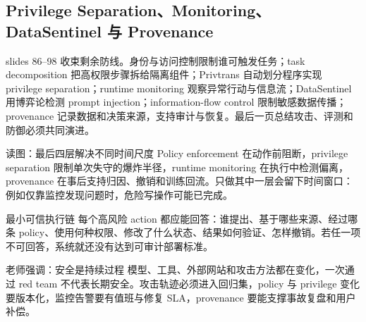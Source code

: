 \subsection{Privilege Separation、Monitoring、DataSentinel 与 Provenance}

slides 86--98 收束剩余防线。身份与访问控制限制谁可触发任务；task decomposition 把高权限步骤拆给隔离组件；Privtrans 自动划分程序实现 privilege separation；runtime monitoring 观察异常行动与信息流；DataSentinel 用博弈论检测 prompt injection；information-flow control 限制敏感数据传播；provenance 记录数据和决策来源，支持审计与恢复。最后一页总结攻击、评测和防御必须共同演进。


\begin{knowledgebox}{读图：最后四层解决不同时间尺度}
Policy enforcement 在动作前阻断，privilege separation 限制单次失守的爆炸半径，runtime monitoring 在执行中检测偏离，provenance 在事后支持归因、撤销和训练回流。只做其中一层会留下时间窗口：例如仅靠监控发现问题时，危险写操作可能已完成。
\end{knowledgebox}

\begin{importantbox}{最小可信执行链}
每个高风险 action 都应能回答：谁提出、基于哪些来源、经过哪条 policy、使用何种权限、修改了什么状态、结果如何验证、怎样撤销。若任一项不可回答，系统就还没有达到可审计部署标准。
\end{importantbox}

\begin{warningbox}{老师强调：安全是持续过程}
模型、工具、外部网站和攻击方法都在变化，一次通过 red team 不代表长期安全。攻击轨迹必须进入回归集，policy 与 privilege 变化要版本化，监控告警要有值班与修复 SLA，provenance 要能支撑事故复盘和用户补偿。
\end{warningbox}

